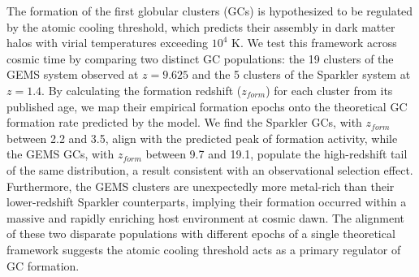 \documentclass[]{article}
\begin{document}
The formation of the first globular clusters (GCs) is hypothesized to be regulated by the atomic cooling threshold, which predicts their assembly in dark matter halos with virial temperatures exceeding $10^4$ K. We test this framework across cosmic time by comparing two distinct GC populations: the 19 clusters of the GEMS system observed at $z=9.625$ and the 5 clusters of the Sparkler system at $z=1.4$. By calculating the formation redshift ($z_{form}$) for each cluster from its published age, we map their empirical formation epochs onto the theoretical GC formation rate predicted by the model. We find the Sparkler GCs, with $z_{form}$ between 2.2 and 3.5, align with the predicted peak of formation activity, while the GEMS GCs, with $z_{form}$ between 9.7 and 19.1, populate the high-redshift tail of the same distribution, a result consistent with an observational selection effect. Furthermore, the GEMS clusters are unexpectedly more metal-rich than their lower-redshift Sparkler counterparts, implying their formation occurred within a massive and rapidly enriching host environment at cosmic dawn. The alignment of these two disparate populations with different epochs of a single theoretical framework suggests the atomic cooling threshold acts as a primary regulator of GC formation.
\end{document}
